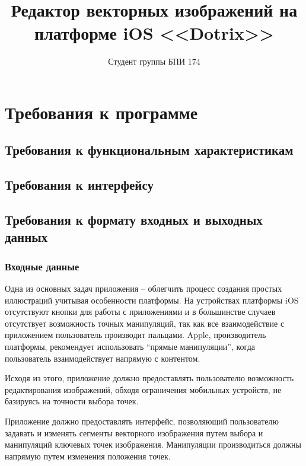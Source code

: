 \documentclass{../TechDoc}
\title{Редактор векторных изображений на платформе iOS <<Dotrix>>}
\author{Студент группы БПИ 174}{И. И. Костюченко}
\begin{document}
    \maketitle
    
    \tableofcontents
    
    
    
    

    \section{Требования к программе}
    
    \subsection{Требования к функциональным характеристикам}
    
    
        
    \subsection{Требования к интерфейсу}
        
    
 
    \subsection{Требования к формату входных и выходных данных}
    
    \subsubsection{Входные данные}

    Одна из основных задач приложения -- облегчить процесс создания простых иллюстраций учитывая особенности платформы. На устройствах платформы iOS отсутствуют кнопки для работы с приложениями и в большинстве случаев отсутствует возможность точных манипуляций, так как все взаимодействие с приложением пользователь производит пальцами. Apple, производитель платформы, рекомендует использовать ``прямые манипуляции'', когда пользователь взаимодействует напрямую с контентом.
    
    Исходя из этого, приложение должно предоставлять пользователю возможность редактирования изображений, обходя ограничения мобильных устройств, не базируясь на точности выбора точек.

    Приложение должно предоставлять интерфейс, позволяющий пользователю задавать и изменять сегменты векторного изображения путем выбора и манипуляций ключевых точек изображения. Манипуляции производиться должны напрямую путем изменения положения точек.
\end{document}
